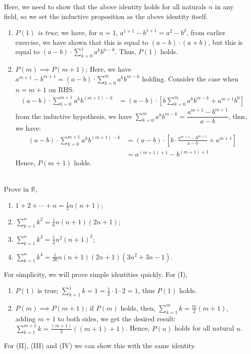 \documentclass[12pt]{book}
\theoremstyle{definition}
\begin{document}
\begin{sol}
Here, we need to show that the above identity holds for all naturals $n$ in any field, so we set the inductive proposition as the above identity itself.
 \begin{enumerate}[label=(\roman*)]
 	\item \textit{$P(1)$ is true}; we have, for $n=1$, $a^{1+1}-b^{1+1}=a^2-b^2$, from earlier exercise, we have shown that this is equal to $(a-b)\cdot (a+b)$, but this is equal to $(a-b)\cdot \sum_{k=0}^1 a^kb^{n-k}$. Thus, $P(1)$ holds.
 	\item $P(m)\implies P(m+1)$; Here, we have $a^{m+1}-b^{m+1}= (a-b)\cdot \sum_{k=0}^m a^kb^{m-k}$ holding. Consider the case when $n=m+1$ on RHS:
 		\begin{align*}
 			(a-b)\cdot \sum_{k=0}^{m+1} a^kb^{(m+1)-k}&=(a-b)\cdot \left[b\sum_{k=0}^{m} a^kb^{m-k} +a^{m+1}b^0 \right]
 		\end{align*}
 		from the inductive hypothesis, we have $\sum_{k=0}^m a^kb^{m-k} = \dfrac{a^{m+1}-b^{m+1}}{a-b}$, thus, we have:
 		\begin{align*}
 			(a-b)\cdot \sum_{k=0}^{m+1} a^kb^{(m+1)-k}&= (a-b)\cdot \left[ b\cdot \frac{a^{m+1}-b^{m+1}}{a-b} +a^{m+1}\right]\\
 			&=a^{(m+1)+1}-b^{(m+1)+1}
 		\end{align*}
 	Hence, $P(m+1)$ holds.   
 \end{enumerate}
\end{sol}
\begin{ex}[10]
\\
Prove in $\mathbb{R}$,
\begin{enumerate}[label=(\Roman*)]
	\item $1+2+\cdots+n= \frac{1}{2}n(n+1)$;
	\item $\sum_{k=1}^n k^2 = \frac{1}{6}n(n+1)(2n+1)$;
	\item $\sum_{k=1}^n k^3 = \frac{1}{4}n^2(n+1)^2$;
	\item $\sum_{k=1}^n k^4 = \frac{1}{30}n(n+1)(2n+1)(3n^2+3n-1)$.
\end{enumerate}	
\end{ex}
\begin{sol}
For simplicity, we will prove simple identities quickly. For (I),
\begin{enumerate}[label=(\roman*)]
	\item $P(1)$ is true; $\sum_{k=1}^1k = 1 = \frac{1}{2}\cdot 1 \cdot 2=1$, thus $P(1)$ holds.
	\item $P(m)\implies P(m+1)$; if $P(m)$ holds, then, $\sum_{k=1}^m k = \frac{m}{2}(m+1)$, adding $m+1$ to both sides, we get the desired result: $\sum_{k=1}^{m+1} k = \frac{(m+1)}{2}((m+1)+1)$. Hence, $P(n)$ holds for all natural $n$. 
\end{enumerate}
For (II), (III) and (IV)  we can show this with the same identity. 
\end{sol}
\end{document}
